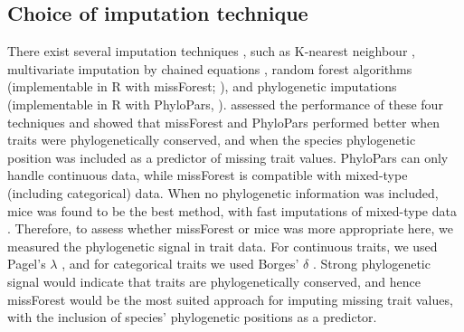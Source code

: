 \clearpage

\subsection{Choice of imputation technique}
There exist several imputation techniques \citep{Etard2020, Penone2014, Debastiani2021, Johnson2021}, such as K-nearest neighbour \citep{Troyanskaya2001}, multivariate imputation by chained equations \citep{mice}, random forest algorithms (implementable in R with missForest; \cite{Stekhoven2012, Stekhoven2016}), and phylogenetic imputations (implementable in R with PhyloPars, \cite{Bruggeman2009}). \citet{Penone2014} assessed the performance of these four techniques and showed that missForest and PhyloPars performed better when traits were phylogenetically conserved, and when the species phylogenetic position was included as a predictor of missing trait values. PhyloPars can only handle continuous data, while missForest is compatible with mixed-type (including categorical) data. When no phylogenetic information was included, mice was found to be the best method, with fast imputations of mixed-type data \citep{Penone2014}. Therefore, to assess whether missForest or mice was more appropriate here, we measured the phylogenetic signal in trait data. For continuous traits, we used Pagel’s $\lambda$ \citep{Pagel1999}, and for categorical traits we used Borges’ $\delta$ \citep{Borges2018}. Strong phylogenetic signal would indicate that traits are phylogenetically conserved, and hence missForest would be the most suited approach for imputing missing trait values, with the inclusion of species’ phylogenetic positions as a predictor. 

